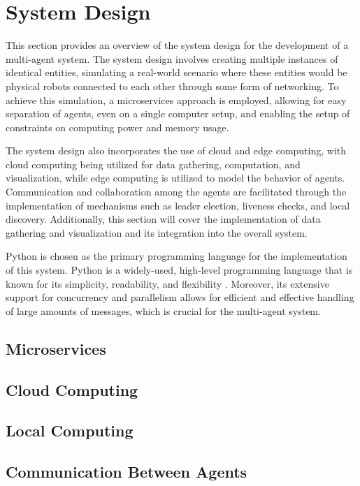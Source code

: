 \chapter{System Design}
This section provides an overview of the system design for the development of a multi-agent system. The system design involves creating multiple instances of identical entities, simulating a real-world scenario where these entities would be physical robots connected to each other through some form of networking. To achieve this simulation, a microservices approach is employed, allowing for easy separation of agents, even on a single computer setup, and enabling the setup of constraints on computing power and memory usage.

The system design also incorporates the use of cloud and edge computing, with cloud computing being utilized for data gathering, computation, and visualization, while edge computing is utilized to model the behavior of agents. Communication and collaboration among the agents are facilitated through the implementation of mechanisms such as leader election, liveness checks, and local discovery. Additionally, this section will cover the implementation of data gathering and visualization and its integration into the overall system.

Python is chosen as the primary programming language for the implementation of this system. Python is a widely-used, high-level programming language that is known for its simplicity, readability, and flexibility \cite{python_docs}. Moreover, its extensive support for concurrency and parallelism allows for efficient and effective handling of large amounts of messages, which is crucial for the multi-agent system.
\section{Microservices}


\section{Cloud Computing}


\section{Local Computing}


\section{Communication Between Agents}


